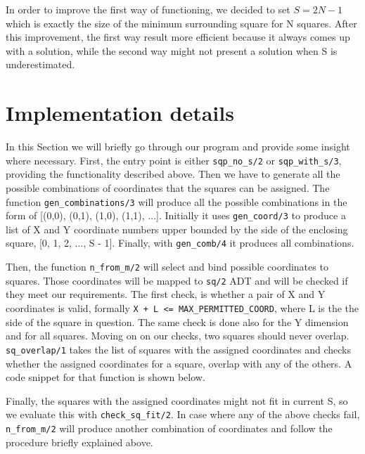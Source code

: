 \documentclass{article}[10pt]
\begin{document}
In order to improve the first way of functioning, we decided to set $S=2N-1$ which is exactly the size of the minimum surrounding square for N squares. After this improvement, the first way result more efficient because it always comes up with a solution, while the second way might not present a solution when S is underestimated.

\section{Implementation details}

In this Section we will briefly go through our program and provide some insight where necessary. First, the entry point is either \texttt{sqp\_no\_s/2} or \texttt{sqp\_with\_s/3}, providing the functionality described above. Then we have to generate all the possible combinations of coordinates that the squares can be assigned. The function \texttt{gen\_combinations/3} will produce all the possible combinations in the form of [(0,0), (0,1), (1,0), (1,1), $\dots$]. Initially it uses \texttt{gen\_coord/3} to produce a list of  X and Y coordinate numbers upper bounded by the side of the enclosing square, [0, 1, 2, $\dots$, S - 1]. Finally, with \texttt{gen\_comb/4} it produces all combinations.

Then, the function \texttt{n\_from\_m/2} will select and bind possible coordinates to squares. Those coordinates will be mapped to \texttt{sq/2} ADT and will be checked if they meet our requirements. The first check, is whether a pair of X and Y coordinates is valid, formally \texttt{X + L <= MAX\_PERMITTED\_COORD}, where L is the the side of the square in question. The same check is done also for the Y dimension and for all squares. Moving on on our checks, two squares should never overlap. \texttt{sq\_overlap/1} takes the list of squares with the assigned coordinates and checks whether the assigned coordinates for a square, overlap with any of the others. A code snippet for that function is shown below.




Finally, the squares with the assigned coordinates might not fit in current S, so we evaluate this with \texttt{check\_sq\_fit/2}. In case where any of the above checks fail, \texttt{n\_from\_m/2} will produce another combination of coordinates and follow the procedure briefly explained above.
\end{document}
